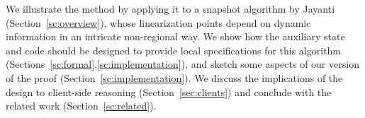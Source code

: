 We illustrate the method by applying it to a snapshot algorithm by
Jayanti~\cite{Jayanti:STOC05} (Section~\ref{sc:overview}), whose
linearization points depend on dynamic information in an intricate
non-regional way. We show how the auxiliary state and code should be
designed to provide local specifications for this algorithm
(Sections~\ref{sc:formal},\ref{sc:implementation}), and sketch some
aspects of our version of the proof (Section~\ref{sc:implementation}).
%
%
%
%
%
We discuss the implications of the design to client-side reasoning
(Section~\ref{sec:clients}) and conclude with the related work (Section~\ref{sc:related}).
%
%
%

